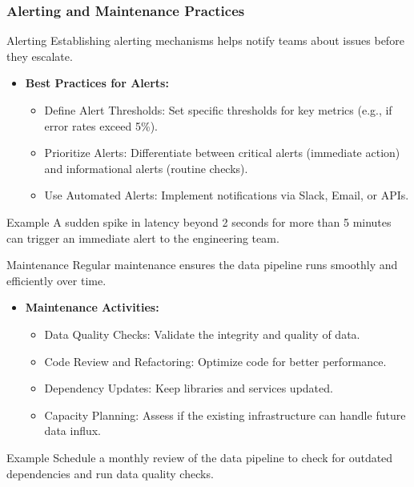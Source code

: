 \documentclass[aspectratio=169]{beamer}
\begin{document}
\begin{frame}[fragile]
    \frametitle{Alerting and Maintenance Practices}
    \begin{block}{Alerting}
        Establishing alerting mechanisms helps notify teams about issues before they escalate.
    \end{block}
    
    \begin{itemize}
        \item \textbf{Best Practices for Alerts:}
        \begin{itemize}
            \item Define Alert Thresholds: Set specific thresholds for key metrics (e.g., if error rates exceed 5\%).
            \item Prioritize Alerts: Differentiate between critical alerts (immediate action) and informational alerts (routine checks).
            \item Use Automated Alerts: Implement notifications via Slack, Email, or APIs.
        \end{itemize}
    \end{itemize}
    
    \begin{block}{Example}
        A sudden spike in latency beyond 2 seconds for more than 5 minutes can trigger an immediate alert to the engineering team.
    \end{block}
    
    \begin{block}{Maintenance}
        Regular maintenance ensures the data pipeline runs smoothly and efficiently over time.
    \end{block}
    
    \begin{itemize}
        \item \textbf{Maintenance Activities:}
        \begin{itemize}
            \item Data Quality Checks: Validate the integrity and quality of data.
            \item Code Review and Refactoring: Optimize code for better performance.
            \item Dependency Updates: Keep libraries and services updated.
            \item Capacity Planning: Assess if the existing infrastructure can handle future data influx.
        \end{itemize}
    \end{itemize}
    
    \begin{block}{Example}
        Schedule a monthly review of the data pipeline to check for outdated dependencies and run data quality checks.
    \end{block}
\end{frame}
\end{document}
